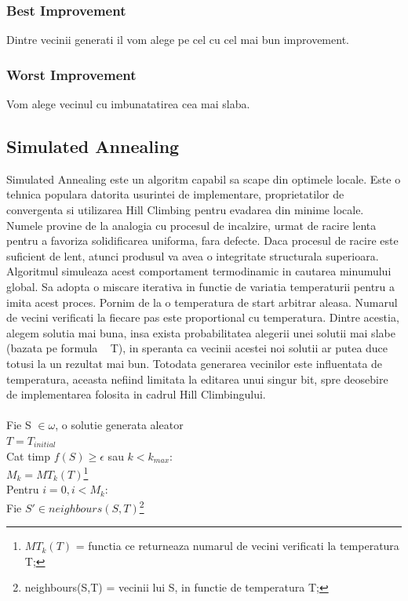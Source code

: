\documentclass{article}
\begin{document}
\subsubsection{Best Improvement}
Dintre vecinii generati il vom alege pe cel cu cel mai bun improvement.
\subsubsection{Worst Improvement}
Vom alege vecinul cu imbunatatirea cea mai slaba.
\subsection{Simulated Annealing}
Simulated Annealing este un algoritm capabil sa scape din optimele locale. Este o tehnica populara datorita usurintei de implementare, proprietatilor de convergenta si utilizarea Hill Climbing pentru evadarea din minime locale. 
Numele provine de la analogia cu procesul de incalzire, urmat de racire lenta pentru a favoriza solidificarea uniforma, fara defecte. Daca procesul de racire este suficient de lent, atunci produsul va avea o integritate structurala superioara. Algoritmul simuleaza acest comportament termodinamic in cautarea minumului global. Sa adopta o miscare iterativa in functie de variatia temperaturii pentru a imita acest proces. Pornim de la o temperatura de start arbitrar aleasa. Numarul de vecini verificati la fiecare pas este proportional cu temperatura. Dintre acestia, alegem solutia mai buna, insa exista probabilitatea alegerii unei solutii mai slabe (bazata pe formula ~ T), in speranta ca vecinii acestei noi solutii ar putea duce totusi la un rezultat mai bun. Totodata generarea vecinilor este influentata de temperatura, aceasta nefiind limitata la editarea unui singur bit, spre deosebire de implementarea folosita in cadrul Hill Climbingului.\\\\
Fie S $\in \omega$, o solutie generata aleator\\
$T = T_{initial}$\\
Cat timp $f(S) \ge \epsilon$ sau $k < k_{max}$:\\
\hspace*{10mm} $M_k = MT_k(T)$\footnote{$MT_k(T)$ = functia ce returneaza numarul de vecini verificati la temperatura T;} \\
\hspace*{10mm} Pentru $i = 0, i < M_k$:\\
\hspace*{10mm}\hspace*{10mm} Fie $S' \in neighbours(S, T)$\footnote{neighbours(S,T) = vecinii lui S, in functie de temperatura T;} \\
\end{document}
